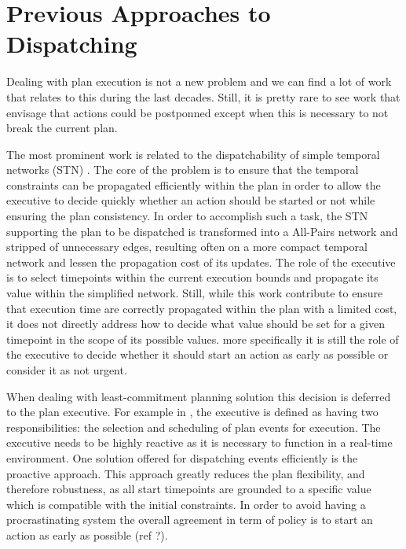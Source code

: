 \section{Previous Approaches to Dispatching}


Dealing with plan execution is not a new problem and we can find a lot
of work that relates to this during the last decades. Still, it is
pretty rare to see work that envisage that actions could be
postponned except when this is necessary to not break the current
plan. 


The most prominent work is related to the dispatchability of simple 
temporal networks (STN) \cite{mus98}. The core of the problem is to
ensure that the temporal constraints can be propagated efficiently
within the plan in order to allow the executive to decide quickly
whether an action should  be started or not while ensuring the plan
consistency. In order to accomplish such a task, the STN supporting
the plan to be dispatched is transformed into a All-Pairs network and
stripped of unnecessary edges, resulting often on a more compact
temporal network and lessen the propagation cost of its updates. The
role of the executive is to select timepoints within the current
execution bounds and propagate its value within the simplified
network. Still, while this work contribute to ensure that execution
time are correctly propagated within the plan with a limited cost, it
does not directly address how to decide what value should be set for a
given timepoint in the scope of its possible values. more specifically
it is still the role of the executive to decide whether it should
start an action as early as possible or consider it as not urgent. 

When dealing with least-commitment planning solution this decision is
deferred to the plan executive. For example in \cite{mus97} 
, the executive is defined as
having two responsibilities: the selection and scheduling of plan
events for execution. The executive needs to
be highly reactive as it is necessary to function in a real-time
environment. One solution offered for dispatching events efficiently
is the proactive approach. This approach greatly reduces the plan
flexibility, and therefore robustness, as all start timepoints are
grounded to a specific value which is compatible with the initial
constraints. In order to avoid having a procrastinating system the
overall agreement in term of policy is to start an action as early as
possible (ref ?). 

